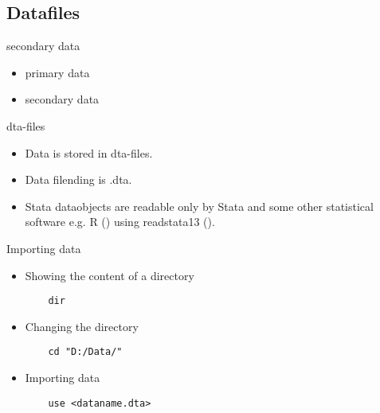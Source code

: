 \subsection{Datafiles}
\begin{frame}{secondary data}
 \begin{itemize}
  \item primary data
  \item secondary data
 \end{itemize}


\end{frame}

\begin{frame}{dta-files}
  \begin{itemize}
  \item Data is stored in dta-files.
  \item Data filending is .dta.
  \item Stata dataobjects are readable only by Stata and some other statistical software e.g. R (\cite{R}) using readstata13 (\cite{readstata13}).
  \end{itemize}
\end{frame}

\begin{frame}[fragile]{Importing data}
  \begin{itemize}
    \item Showing the content of a directory 
    \begin{lstlisting}
    dir
    \end{lstlisting}
    \item Changing the directory 
    \begin{lstlisting}
    cd "D:/Data/"
    \end{lstlisting}
    \item Importing data  
    \begin{lstlisting}
    use <dataname.dta>
    \end{lstlisting}
  \end{itemize}
  
\end{frame}

